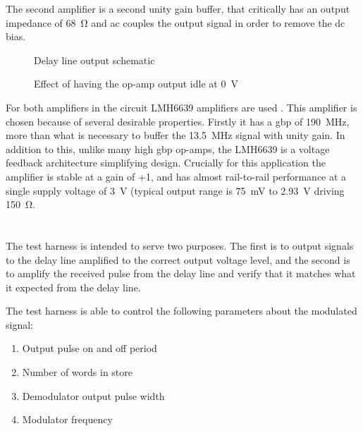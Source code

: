 The second amplifier is a second unity gain buffer, that critically has an output impedance of \SI{68}{\ohm} and \gls{ac} couples the output signal in order to remove the \gls{dc} bias.

\begin{figure}[ht]
	\centering
	\caption{Delay line output schematic }
	\label{fig:delay-line-output-sch}
\end{figure}

\begin{figure}[ht]
	\centering
	\dummyfigure
	\caption{Effect of having the op-amp output idle at \SI{0}{\volt}}
	\label{fig:delay-line-output-coupling}
\end{figure}

For both amplifiers in the circuit LMH6639 amplifiers are used \cite{ti2013}. This amplifier is chosen because of several desirable properties. Firstly it has a \gls{gbp} of \SI{190}{\mega\hertz}, more than what is necessary to buffer the \SI{13.5}{\mega\hertz} signal with unity gain. In addition to this, unlike many high \gls{gbp} op-amps, the LMH6639 is a voltage feedback architecture simplifying design. Crucially for this application the amplifier is stable at a gain of +1, and has almost rail-to-rail performance at a single supply voltage of \SI{3}{\volt} (typical output range is \SI{75}{\milli\volt} to \SI{2.93}{\volt} driving \SI{150}{\ohm}.


\chapter{} \label{sec:test-harness-design}

The test harness is intended to serve two purposes. The first is to output signals to the delay line amplified to the correct output voltage level, and the second is to amplify the received pulse from the delay line and verify that it matches what it expected from the delay line.

The test harness is able to control the following parameters about the modulated signal:
\begin{enumerate}
	\item Output pulse on and off period
	\item Number of words in store
	\item Demodulator output pulse width
	\item Modulator frequency
\end{enumerate}


